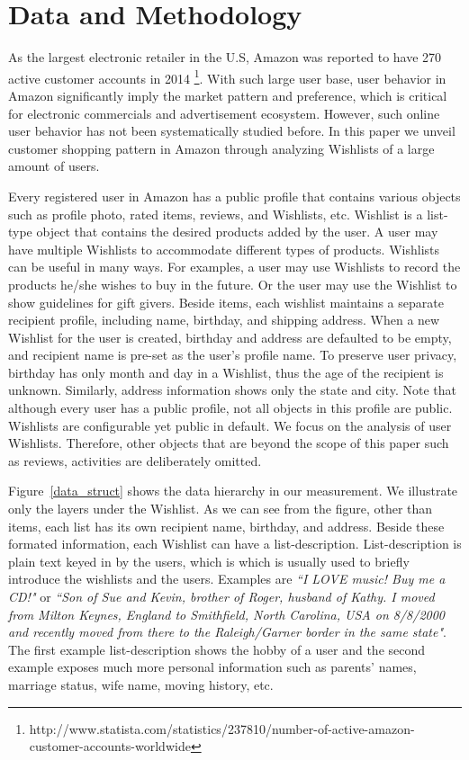 \section{Data and Methodology}
As the largest electronic retailer in the U.S, Amazon was reported to have 270 active customer accounts in 2014 \footnote{http://www.statista.com/statistics/237810/number-of-active-amazon-customer-accounts-worldwide}. With such large user base, user behavior in Amazon significantly imply the market pattern and preference, which is critical for electronic commercials and advertisement ecosystem. However, such online user behavior has not been systematically studied before. In this paper we unveil customer shopping pattern in Amazon through analyzing Wishlists of a large amount of users.

Every registered user in Amazon has a public profile that contains various objects such as profile photo, rated items, reviews, and Wishlists, etc. Wishlist is a list-type object that contains the desired products added by the user. A user may have multiple Wishlists to accommodate different types of products. Wishlists can be useful in many ways. For examples, a user may use Wishlists to record the products he/she wishes to buy in the future. Or the user may use the Wishlist to show guidelines for gift givers. Beside items, each wishlist maintains a separate recipient profile, including name, birthday, and shipping address. When a new Wishlist for the user is created, birthday and address are defaulted to be empty, and recipient name is pre-set as the user's profile name. To preserve user privacy, birthday has only month and day in a Wishlist, thus the age of the recipient is unknown. Similarly, address information shows only the state and city. Note that although every user has a public profile, not all objects in this profile are public. Wishlists are configurable yet public in default. We focus on the analysis of user Wishlists. Therefore, other objects that are beyond the scope of this paper such as reviews, activities are deliberately omitted.

Figure~\ref{data_struct} shows the data hierarchy in our measurement. We illustrate only the layers under the Wishlist. As we can see from the figure, other than items, each list has its own recipient name, birthday, and address. Beside these formated information, each Wishlist can have a list-description. List-description is plain text keyed in by the users, which is which is usually used to briefly introduce the wishlists and the users. Examples are \emph{``I LOVE music! Buy me a CD!"} or \emph{``Son of Sue and Kevin, brother of Roger, husband of Kathy. I moved from Milton Keynes, England to Smithfield, North Carolina, USA on 8/8/2000 and recently moved from there to the Raleigh/Garner border in the same state"}. The first example list-description shows the hobby of a user and the second example exposes much more personal information such as parents' names, marriage status, wife name, moving history, etc. 

